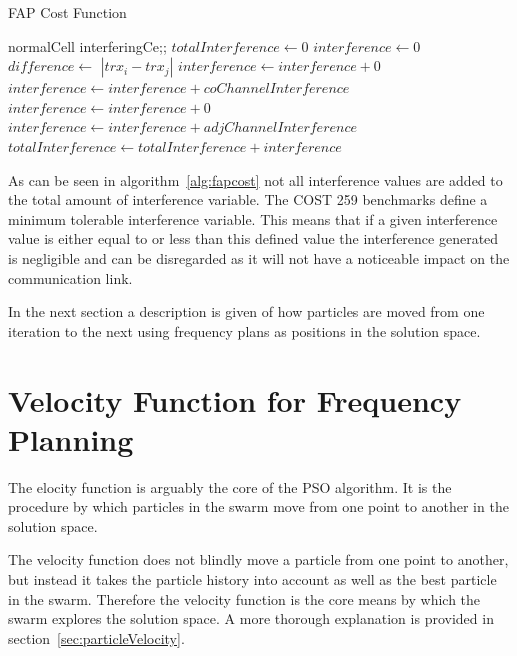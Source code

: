 \begin{algorithm}
\caption{FAP Cost Function}
\label{alg:fapcost}
	\begin{algorithmic}[1]
	\Require normalCell
	\Require interferingCe;;
	\State $totalInterference \leftarrow $0
			\State $interference \leftarrow 0$
			\State $difference \leftarrow$ $|trx_i - trx_j|$
					\State $interference \leftarrow interference + 0$
				\Else
					\State $interference \leftarrow interference + coChannelInterference$
				\EndIf
			\Else
						\State $interference \leftarrow interference + 0$
					\Else
						\State $interference \leftarrow interference + adjChannelInterference$
					\EndIf
				\EndIf
			\EndIf
			\State $totalInterference \leftarrow totalInterference + interference$
		\EndFor
	\EndFor
	\end{algorithmic}
\end{algorithm}

As can be seen in algorithm~\ref{alg:fapcost} not all interference values are added to the total amount of interference variable. The COST 259 benchmarks define a minimum tolerable interference variable. This means that if a given interference value is either equal to or less than this defined value the interference generated is negligible and can be disregarded as it will not have a noticeable impact on the communication link.

In the next section a description is given of how particles are moved from one iteration to the next using frequency plans as positions in the solution space.
\section{Velocity Function for Frequency Planning}
\label{sec:velocityFAP}
The elocity function is arguably the core of the PSO algorithm. It is the procedure by which particles in the swarm move from one point to another in the solution space. 

The velocity function does not blindly move a particle from one point to another, but instead it takes the particle history into account as well as the best particle in the swarm. Therefore the velocity function is the core means by which the swarm explores the solution space. A more thorough explanation is provided in section~\ref{sec:particleVelocity}.

